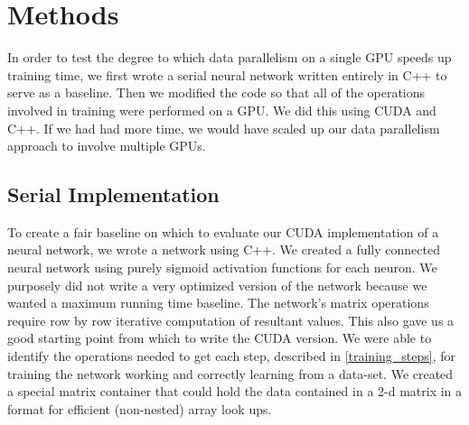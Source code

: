 \documentclass[11pt,a4paper]{article}
\begin{document}
\section{Methods}
In order to test the degree to which data parallelism on a single GPU speeds up training time, we first wrote a serial neural network written entirely in C++ to serve as a baseline. Then we modified the code so that all of the operations involved in training were performed on a GPU. We did this using  CUDA and C++. If we had had more time, we would have scaled up our data parallelism approach to involve multiple GPUs. 

\subsection{Serial Implementation}
To create a fair baseline on which to evaluate our CUDA implementation of a neural network, we wrote a network using C++. We created a fully connected neural network using purely sigmoid activation functions for each neuron. We purposely did not write a very optimized version of the network because we wanted a maximum running time baseline. The network's matrix operations require row by row iterative computation of resultant values. This also gave us a good starting point from which to write the CUDA version. We were able to identify the operations needed to get each step, described in \ref{training_steps}, for training the network working and correctly learning from a data-set. We created a special matrix container that could hold the data contained in a 2-d matrix in a format for efficient (non-nested) array look ups. 
\end{document}
